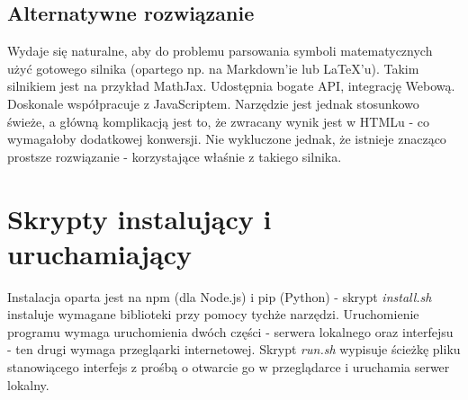 \subsection{Alternatywne rozwiązanie}%
Wydaje się naturalne, aby do problemu parsowania symboli matematycznych użyć gotowego silnika (opartego np. na Markdown'ie lub \LaTeX{}'u). Takim silnikiem jest na przykład MathJax. Udostępnia bogate API, integrację Webową. Doskonale współpracuje z JavaScriptem. Narzędzie jest jednak stosunkowo świeże, a główną komplikacją jest to, że zwracany wynik jest w HTMLu - co wymagałoby dodatkowej konwersji. Nie wykluczone jednak, że istnieje znacząco prostsze rozwiązanie - korzystające właśnie z takiego silnika.
\section{Skrypty instalujący i uruchamiający}
Instalacja oparta jest na npm (dla Node.js) i pip (Python) - skrypt \textit{install.sh} instaluje wymagane biblioteki przy pomocy tychże narzędzi.
\ind  Uruchomienie programu wymaga uruchomienia dwóch części - serwera lokalnego oraz interfejsu - ten drugi wymaga przegląarki internetowej. Skrypt \textit{run.sh} wypisuje ścieżkę pliku stanowiącego interfejs z prośbą o otwarcie go w przeglądarce i uruchamia serwer lokalny.










